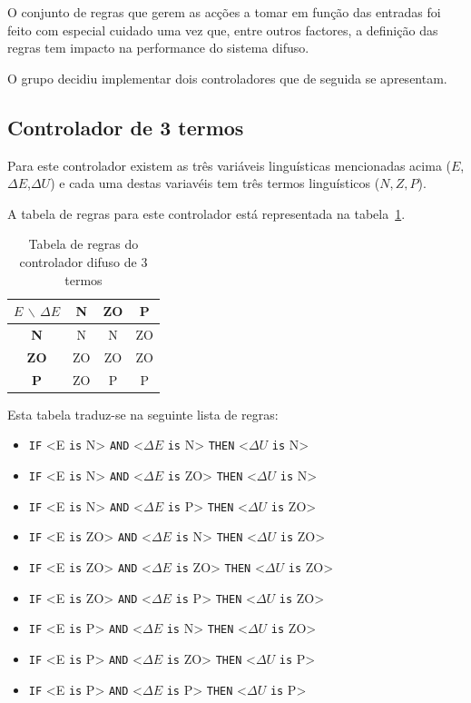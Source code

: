 \documentclass{article}
\begin{document}
O conjunto de regras que gerem as acções a tomar em função das entradas foi feito com especial cuidado uma vez que, entre outros factores, a definição das regras tem impacto na performance do sistema difuso.

O grupo decidiu implementar dois controladores que de seguida se apresentam.

\subsection{Controlador de 3 termos}
Para este controlador existem as três variáveis linguísticas mencionadas acima ($E$,$\Delta E$,$\Delta U$) e cada uma destas variavéis tem três termos linguísticos (${N,Z,P}$).

A tabela de regras para este controlador está representada na tabela~\ref{3_terms_fuzzy}.

\begin{table}[!h]
\centering
	\caption{Tabela de regras do controlador difuso de 3 termos}
	\label{3_terms_fuzzy}
	\begin{tabular}{|c|c|c|c|}
	\hline
	$E$ $\backslash$ $\Delta E$ & \textbf{N} & \textbf{ZO} & \textbf{P} \\ 
	\hline 
	\textbf{N} & N & N & ZO \\ 
	\hline 
	\textbf{ZO} & ZO & ZO & ZO \\ 
	\hline 
	\textbf{P} & ZO & P & P \\ 
	\hline 
	\end{tabular} 
\end{table}

Esta tabela traduz-se na seguinte lista de regras:
\begin{itemize}
	\item \texttt{IF} <E \texttt{is} N> \texttt{AND} <$\Delta E$ \texttt{is} N> \texttt{THEN} <$\Delta U$ \texttt{is} N>
	\item \texttt{IF} <E \texttt{is} N> \texttt{AND} <$\Delta E$ \texttt{is} ZO> \texttt{THEN} <$\Delta U$ \texttt{is} N>
	\item \texttt{IF} <E \texttt{is} N> \texttt{AND} <$\Delta E$ \texttt{is} P> \texttt{THEN} <$\Delta U$ \texttt{is} ZO>
	\item \texttt{IF} <E \texttt{is} ZO> \texttt{AND} <$\Delta E$ \texttt{is} N> \texttt{THEN} <$\Delta U$ \texttt{is} ZO>
	\item \texttt{IF} <E \texttt{is} ZO> \texttt{AND} <$\Delta E$ \texttt{is} ZO> \texttt{THEN} <$\Delta U$ \texttt{is} ZO>
	\item \texttt{IF} <E \texttt{is} ZO> \texttt{AND} <$\Delta E$ \texttt{is} P> \texttt{THEN} <$\Delta U$ \texttt{is} ZO>
	\item \texttt{IF} <E \texttt{is} P> \texttt{AND} <$\Delta E$ \texttt{is} N> \texttt{THEN} <$\Delta U$ \texttt{is} ZO>
	\item \texttt{IF} <E \texttt{is} P> \texttt{AND} <$\Delta E$ \texttt{is} ZO> \texttt{THEN} <$\Delta U$ \texttt{is} P>
	\item \texttt{IF} <E \texttt{is} P> \texttt{AND} <$\Delta E$ \texttt{is} P> \texttt{THEN} <$\Delta U$ \texttt{is} P>
\end{itemize}
\end{document}
